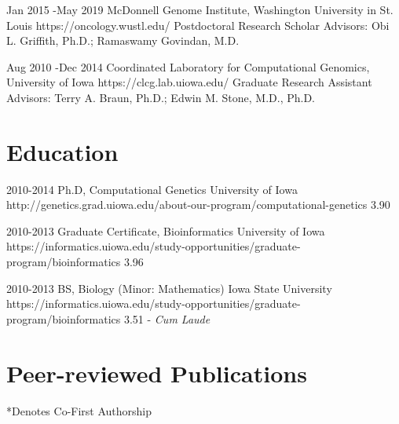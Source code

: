 \documentclass[10pt]{article} %
\begin{document}

\job
{Jan 2015 -}{May 2019}
{McDonnell Genome Institute, Washington University in St. Louis}
{https://oncology.wustl.edu/}
{Postdoctoral Research Scholar}
{Advisors: Obi L. Griffith, Ph.D.; Ramaswamy Govindan, M.D.}


\job
{Aug 2010 -}{Dec 2014}
{Coordinated Laboratory for Computational Genomics, University of Iowa}
{https://clcg.lab.uiowa.edu/}
{Graduate Research Assistant}
{Advisors: Terry A. Braun, Ph.D.; Edwin M. Stone, M.D., Ph.D.}


\section{Education}

\edu
{2010-2014}
{Ph.D, Computational Genetics}
{University of Iowa}
{http://genetics.grad.uiowa.edu/about-our-program/computational-genetics}
{3.90}


\edu
{2010-2013}
{Graduate Certificate, Bioinformatics}
{University of Iowa}
{https://informatics.uiowa.edu/study-opportunities/graduate-program/bioinformatics}
{3.96}


\edu
{2010-2013}
{BS, Biology (Minor: Mathematics)}
{Iowa State University}
{https://informatics.uiowa.edu/study-opportunities/graduate-program/bioinformatics}
{3.51  - \textit{Cum Laude}}


\section{Peer-reviewed Publications}

*Denotes Co-First Authorship

\begin{enumerate}
 


\end{enumerate}
\end{document}
